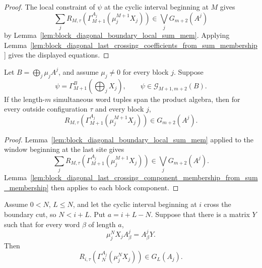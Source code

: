 \begin{proof}
    \leanok
    The local constraint of \(\psi\) at the cyclic interval beginning at \(M\)
    gives
    \[
        \sum_j
        R_{M,\tau}\!\left(\Gamma_{M+1}^{A_j}(\mu_j^{M+1}X_j)\right)
        \in \bigvee_j G_{m+2}(A^j)
    \]
    by Lemma~\ref{lem:block_diagonal_boundary_local_sum_mem}. Applying
    Lemma~\ref{lem:block_diagonal_last_crossing_coefficients_from_sum_membership}
    gives the displayed equations.
\end{proof}

\begin{lemma}
    \label{lem:block_diagonal_last_crossing_component_membership_from_chain_ground_space}
    \leanok
    Let \(B=\bigoplus_j\mu_jA^j\), and assume \(\mu_j\ne0\) for every block
    \(j\). Suppose
    \[
        \psi=\Gamma_{M+1}^{B}\!\left(\bigoplus_jX_j\right),
        \qquad
        \psi\in\mathcal G_{M+1,m+2}(B).
    \]
    If the length-\(m\) simultaneous word tuples span the product algebra, then
    for every outside configuration \(\tau\) and every block \(j\),
    \[
        R_{M,\tau}\!\left(\Gamma_{M+1}^{A_j}(\mu_j^{M+1}X_j)\right)
        \in G_{m+2}(A^j).
    \]
\end{lemma}

\begin{proof}
    \leanok
    Lemma~\ref{lem:block_diagonal_boundary_local_sum_mem} applied to the
    window beginning at the last site gives
    \[
        \sum_j
        R_{M,\tau}\!\left(\Gamma_{M+1}^{A_j}(\mu_j^{M+1}X_j)\right)
        \in \bigvee_j G_{m+2}(A^j).
    \]
    Lemma~\ref{lem:block_diagonal_last_crossing_component_membership_from_sum_membership}
    then applies to each block component.
\end{proof}

\begin{lemma}
    \label{lem:block_diagonal_boundary_crossing_right_boundary_matrix}
    \leanok
    Assume \(0<N\), \(L\le N\), and let the cyclic interval beginning at \(i\)
    cross the boundary cut, so \(N<i+L\). Put \(a=i+L-N\). Suppose that there is
    a matrix \(Y\) such that for every word \(\beta\) of length \(a\),
    \[
        \mu_j^N X_j A^j_\beta=A^j_\beta Y .
    \]
    Then
    \[
        R_{i,\tau}\!\left(\Gamma_N^{A_j}(\mu_j^NX_j)\right)
        \in G_L(A_j).
    \]
\end{lemma}

